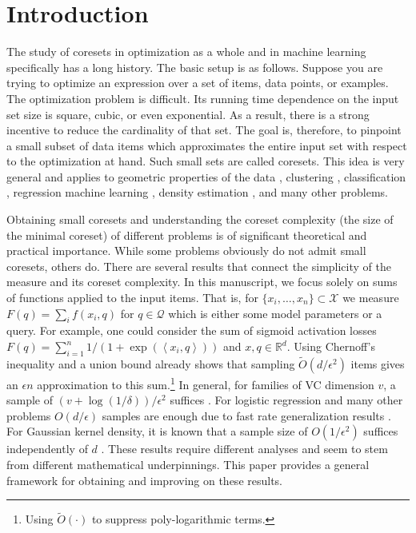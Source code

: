 \documentclass[12pt]{colt2019} %
\newcommand{\ip}[1]{\left \langle #1 \right \rangle}
\newcommand{\R}{\mathbb{R}}
\newcommand{\eps}{\epsilon}
\newcommand{\X}{\mathcal{X}}
\newcommand{\Q}{\mathcal{Q}}
\begin{document}
\section{Introduction}
The study of coresets in optimization as a whole and in machine learning specifically has a long history. 
The basic setup is as follows.
Suppose you are trying to optimize an expression over a set of items, data points, or examples.
The optimization problem is difficult. 
Its running time dependence on the input set size is square, cubic, or even exponential.
As a result, there is a strong incentive to reduce the cardinality of that set. 
The goal is, therefore, to pinpoint a small subset of data items which approximates the entire input set with respect to the optimization at hand. 
Such small sets are called coresets. 
This idea is very general and applies to geometric properties of the data \cite{agarwal2005geometric}, 
clustering \cite{DBLP:conf/compgeom/Har-PeledK05} \cite{DBLP:conf/stoc/FeldmanL11}, classification \cite{DBLP:conf/ijcai/Har-PeledRZ07}, regression \cite{DBLP:conf/nips/MunteanuSSW18} 
machine learning \cite{bachem2017practical}, density estimation \cite{DBLP:journals/corr/abs-1802-01751}, and many other problems. 

Obtaining small coresets and understanding the coreset complexity (the size of the minimal coreset) of different problems is of significant theoretical and practical importance.
While some problems obviously do not admit small coresets, others do. 
There are several results that connect the simplicity of the measure and its coreset complexity.
In this manuscript, we focus solely on sums of functions applied to the input items.
That is, for $\{x_i,\ldots,x_n\} \subset \X$ we measure $F(q) = \sum_i f(x_i,q)$ for $q \in \Q$ which is either some model parameters or a query.
For example, one could consider the sum of sigmoid activation losses $F(q) = \sum_{i=1}^{n} 1/(1+ \exp(\ip{x_i,q}))$ and $x,q\in \R^d$.
Using Chernoff's inequality and a union bound already shows that sampling $\tilde O(d/\eps^2)$ items gives an $\eps n$ approximation to this sum.\footnote{Using $\tilde O(\cdot)$ to suppress poly-logarithmic terms.} 
In general, for families of VC dimension $v$, a sample of $(v+\log(1/\delta))/\eps^2$ suffices \cite{talagrand1994sharper}.
For logistic regression and many other problems $O(d/\eps)$ samples are enough due to fast rate generalization results \cite{van2015fast}.
For Gaussian kernel density, it is known that a sample size of $O(1/\eps^2)$ suffices independently of $d$  \cite{lopez2015towards}.
These results require different analyses and seem to stem from different mathematical underpinnings. 
This paper provides a general framework for obtaining and improving on these results. 
\end{document}
